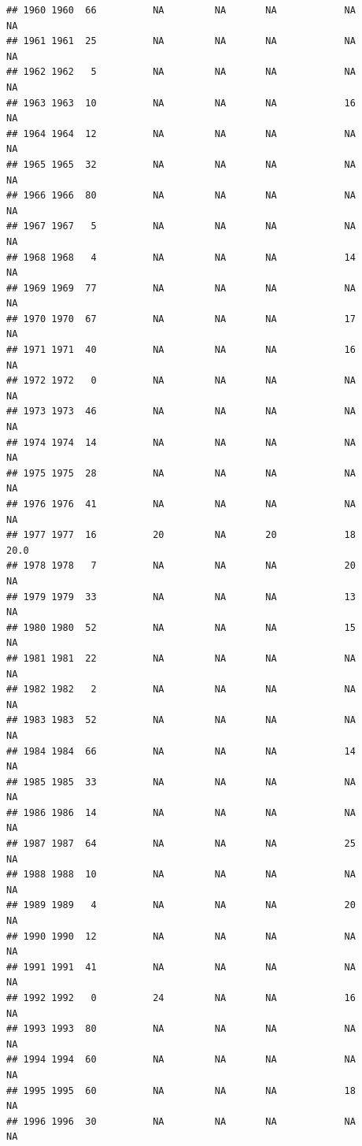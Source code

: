 \documentclass[man]{apa6}
\begin{document}
\begin{verbatim}
## 1960 1960  66          NA         NA       NA            NA       NA
## 1961 1961  25          NA         NA       NA            NA       NA
## 1962 1962   5          NA         NA       NA            NA       NA
## 1963 1963  10          NA         NA       NA            16       NA
## 1964 1964  12          NA         NA       NA            NA       NA
## 1965 1965  32          NA         NA       NA            NA       NA
## 1966 1966  80          NA         NA       NA            NA       NA
## 1967 1967   5          NA         NA       NA            NA       NA
## 1968 1968   4          NA         NA       NA            14       NA
## 1969 1969  77          NA         NA       NA            NA       NA
## 1970 1970  67          NA         NA       NA            17       NA
## 1971 1971  40          NA         NA       NA            16       NA
## 1972 1972   0          NA         NA       NA            NA       NA
## 1973 1973  46          NA         NA       NA            NA       NA
## 1974 1974  14          NA         NA       NA            NA       NA
## 1975 1975  28          NA         NA       NA            NA       NA
## 1976 1976  41          NA         NA       NA            NA       NA
## 1977 1977  16          20         NA       20            18     20.0
## 1978 1978   7          NA         NA       NA            20       NA
## 1979 1979  33          NA         NA       NA            13       NA
## 1980 1980  52          NA         NA       NA            15       NA
## 1981 1981  22          NA         NA       NA            NA       NA
## 1982 1982   2          NA         NA       NA            NA       NA
## 1983 1983  52          NA         NA       NA            NA       NA
## 1984 1984  66          NA         NA       NA            14       NA
## 1985 1985  33          NA         NA       NA            NA       NA
## 1986 1986  14          NA         NA       NA            NA       NA
## 1987 1987  64          NA         NA       NA            25       NA
## 1988 1988  10          NA         NA       NA            NA       NA
## 1989 1989   4          NA         NA       NA            20       NA
## 1990 1990  12          NA         NA       NA            NA       NA
## 1991 1991  41          NA         NA       NA            NA       NA
## 1992 1992   0          24         NA       NA            16       NA
## 1993 1993  80          NA         NA       NA            NA       NA
## 1994 1994  60          NA         NA       NA            NA       NA
## 1995 1995  60          NA         NA       NA            18       NA
## 1996 1996  30          NA         NA       NA            NA       NA

\end{verbatim}
\end{document}
